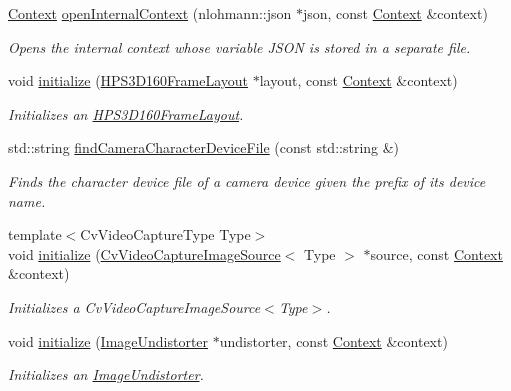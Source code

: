 \begin{DoxyCompactItemize}
\hyperlink{classstereo__ugv_1_1Context}{Context} \hyperlink{namespacestereo__ugv_aef8f9a951e11f9d5d178db99754aac4b}{open\+Internal\+Context} (nlohmann\+::json $\ast$json, const \hyperlink{classstereo__ugv_1_1Context}{Context} \&context)
\begin{DoxyCompactList}\small\item\em Opens the internal context whose variable J\+S\+ON is stored in a separate file. \end{DoxyCompactList}\item 
void \hyperlink{namespacestereo__ugv_ac02cc03581ba53b911a9a7bd87f9a24c}{initialize} (\hyperlink{classstereo__ugv_1_1HPS3D160FrameLayout}{H\+P\+S3\+D160\+Frame\+Layout} $\ast$layout, const \hyperlink{classstereo__ugv_1_1Context}{Context} \&context)
\begin{DoxyCompactList}\small\item\em Initializes an \hyperlink{classstereo__ugv_1_1HPS3D160FrameLayout}{H\+P\+S3\+D160\+Frame\+Layout}. \end{DoxyCompactList}\item 
std\+::string \hyperlink{namespacestereo__ugv_af45c67058883fb26e2c27945af6ab490}{find\+Camera\+Character\+Device\+File} (const std\+::string \&)
\begin{DoxyCompactList}\small\item\em Finds the character device file of a camera device given the prefix of its device name. \end{DoxyCompactList}\item 
{\footnotesize template$<$Cv\+Video\+Capture\+Type Type$>$ }\\void \hyperlink{namespacestereo__ugv_acaec0936792769b5d676773f7d4070cd}{initialize} (\hyperlink{classstereo__ugv_1_1CvVideoCaptureImageSource}{Cv\+Video\+Capture\+Image\+Source}$<$ Type $>$ $\ast$source, const \hyperlink{classstereo__ugv_1_1Context}{Context} \&context)
\begin{DoxyCompactList}\small\item\em Initializes a Cv\+Video\+Capture\+Image\+Source$<$\+Type$>$. \end{DoxyCompactList}\item 
void \hyperlink{namespacestereo__ugv_ab607b745fcce81036bd29780d14513e5}{initialize} (\hyperlink{classstereo__ugv_1_1ImageUndistorter}{Image\+Undistorter} $\ast$undistorter, const \hyperlink{classstereo__ugv_1_1Context}{Context} \&context)
\begin{DoxyCompactList}\small\item\em Initializes an \hyperlink{classstereo__ugv_1_1ImageUndistorter}{Image\+Undistorter}. \end{DoxyCompactList}\item 

\end{DoxyCompactItemize}
